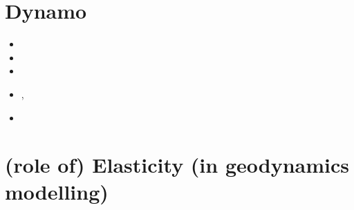 \section{Dynamo}

\begin{small}
\begin{itemize}
\item[\twothousandfive] 
\item[\twothousandnine] 
\item[\twothousandeleven] 
\item[\twothousandthirteen] , 
\item[\twothousandsixteen] 
\end{itemize}
\end{small}

\section{(role of) Elasticity (in geodynamics modelling)}

